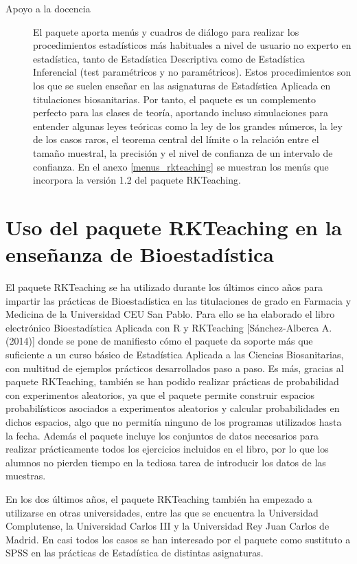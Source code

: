\documentclass[10pt,twoside,spanish]{article}
\numberwithin{equation}{section}
\begin{document}
\begin{description}
\item[Apoyo a la docencia] El paquete aporta menús y cuadros de diálogo para realizar los
procedimientos estadísticos más habituales a nivel de usuario no experto en estadística, tanto de Estadística Descriptiva como de
Estadística Inferencial (test paramétricos y no paramétricos).
Estos procedimientos son los que se suelen enseñar en las asignaturas de Estadística Aplicada en titulaciones biosanitarias.
Por tanto, el paquete es un complemento perfecto para las clases de teoría, aportando incluso simulaciones para entender algunas leyes
teóricas como la ley de los grandes números, la ley de los casos raros, el teorema central del límite o la relación entre el tamaño
muestral, la precisión y el nivel de confianza de un intervalo de confianza.
En el anexo \ref{menus_rkteaching} se muestran los menús que incorpora la versión 1.2 del paquete RKTeaching.
\end{description}

\section{Uso del paquete RKTeaching en la enseñanza de Bioestadística}
El paquete RKTeaching se ha utilizado durante los últimos cinco años para impartir las prácticas de Bioestadística en las titulaciones de
grado en Farmacia y Medicina de la Universidad CEU San Pablo. 
Para ello se ha elaborado el libro electrónico Bioestadística Aplicada con R y RKTeaching [Sánchez-Alberca A. (2014)] donde se pone
de manifiesto cómo el paquete da soporte más que suficiente a un curso básico de Estadística Aplicada a las Ciencias Biosanitarias, con
multitud de ejemplos prácticos desarrollados paso a paso. 
Es más, gracias al paquete RKTeaching, también se han podido realizar prácticas de probabilidad con experimentos aleatorios, ya que el
paquete permite construir espacios probabilísticos asociados a experimentos aleatorios y calcular probabilidades en dichos espacios, algo
que no permitía ninguno de los programas utilizados hasta la fecha.
Además el paquete incluye los conjuntos de datos necesarios para
realizar prácticamente todos los ejercicios incluidos en el libro, por lo que los alumnos no pierden tiempo en la tediosa tarea de introducir los datos de las muestras.

En los dos últimos años, el paquete RKTeaching también ha empezado a utilizarse en otras universidades, entre las que se encuentra la
Universidad Complutense, la Universidad Carlos III y la Universidad Rey Juan Carlos de Madrid.
En casi todos los casos se han interesado por el
paquete como sustituto a SPSS en las prácticas de Estadística de distintas asignaturas.
\end{document}
